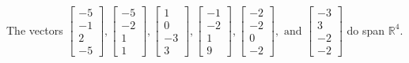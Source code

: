 \begin{exercise}
\begin{exerciseStatement}
  \end{exerciseStatement}
  \begin{exerciseAnswer}
   The vectors \(\left[\begin{array}{r}
-5 \\
-1 \\
2 \\
-5
\end{array}\right] , \left[\begin{array}{r}
-5 \\
-2 \\
1 \\
1
\end{array}\right] , \left[\begin{array}{r}
1 \\
0 \\
-3 \\
3
\end{array}\right] , \left[\begin{array}{r}
-1 \\
-2 \\
1 \\
9
\end{array}\right] , \left[\begin{array}{r}
-2 \\
-2 \\
0 \\
-2
\end{array}\right] , \text{ and } \left[\begin{array}{r}
-3 \\
3 \\
-2 \\
-2
\end{array}\right]\) 
  	 do  
	span \(\mathbb{R}^4\).
  


  \end{exerciseAnswer}
\end{exercise}